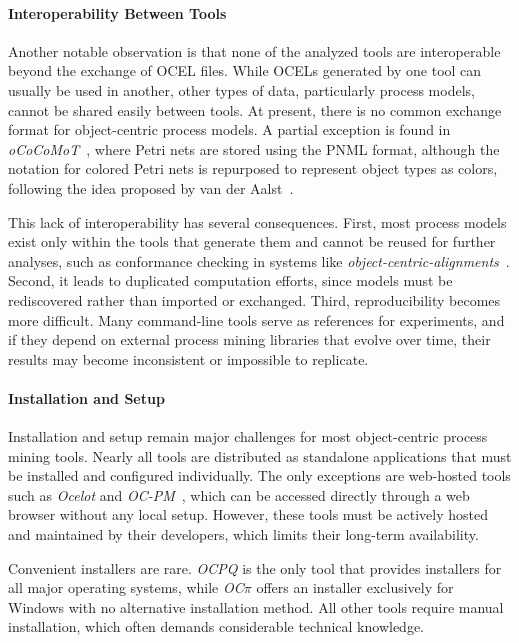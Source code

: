 \paragraph{Interoperability Between Tools}

Another notable observation is that none of the analyzed tools are interoperable beyond the exchange of OCEL files. While OCELs generated by one tool can usually be used in another, other types of data, particularly process models, cannot be shared easily between tools. At present, there is no common exchange format for object-centric process models. A partial exception is found in \textit{oCoCoMoT}~\cite{ococomot}, where Petri nets are stored using the PNML format, although the notation for colored Petri nets is repurposed to represent object types as colors, following the idea proposed by van der Aalst~\cite{processdiscovery}.

This lack of interoperability has several consequences. First, most process models exist only within the tools that generate them and cannot be reused for further analyses, such as conformance checking in systems like \textit{object-centric-alignments}~\cite{alignments}. Second, it leads to duplicated computation efforts, since models must be rediscovered rather than imported or exchanged. Third, reproducibility becomes more difficult. Many command-line tools serve as references for experiments, and if they depend on external process mining libraries that evolve over time, their results may become inconsistent or impossible to replicate.


\paragraph{Installation and Setup}

Installation and setup remain major challenges for most object-centric process mining tools. Nearly all tools are distributed as standalone applications that must be installed and configured individually. The only exceptions are web-hosted tools such as \textit{Ocelot} and \textit{OC-PM}~\cite{ocpm}, which can be accessed directly through a web browser without any local setup. However, these tools must be actively hosted and maintained by their developers, which limits their long-term availability.

Convenient installers are rare. \textit{OCPQ} is the only tool that provides installers for all major operating systems, while \textit{OC$\pi$} offers an installer exclusively for Windows with no alternative installation method. All other tools require manual installation, which often demands considerable technical knowledge.

